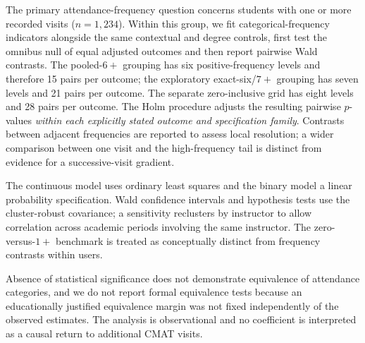 The primary attendance-frequency question concerns students with one or more recorded visits ($n=1,234$). Within this group, we fit categorical-frequency indicators alongside the same contextual and degree controls, first test the omnibus null of equal adjusted outcomes and then report pairwise Wald contrasts. The pooled-$6+$ grouping has six positive-frequency levels and therefore 15 pairs per outcome; the exploratory exact-six/$7+$ grouping has seven levels and 21 pairs per outcome. The separate zero-inclusive grid has eight levels and 28 pairs per outcome. The Holm procedure adjusts the resulting pairwise $p$-values \emph{within each explicitly stated outcome and specification family}. Contrasts between adjacent frequencies are reported to assess local resolution; a wider comparison between one visit and the high-frequency tail is distinct from evidence for a successive-visit gradient.

The continuous model uses ordinary least squares and the binary model a linear probability specification. Wald confidence intervals and hypothesis tests use the cluster-robust covariance; a sensitivity reclusters by instructor to allow correlation across academic periods involving the same instructor. The zero-versus-$1+$ benchmark is treated as conceptually distinct from frequency contrasts within users.

Absence of statistical significance does not demonstrate equivalence of attendance categories, and we do not report formal equivalence tests because an educationally justified equivalence margin was not fixed independently of the observed estimates. The analysis is observational and no coefficient is interpreted as a causal return to additional CMAT visits.

